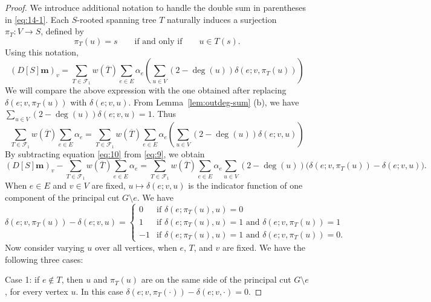 \documentclass{amsart}
\theoremstyle{definition}
\newcommand{\boldm}{\mathbf{m}}
\newcommand{\trees}{\mathcal{F}_1}
\newcommand{\degout}{\deg^o}
\begin{document}
\begin{proof}
We introduce additional notation to handle the double sum in parentheses in \eqref{eq:14-1}.
Each $S$-rooted spanning tree $T$ naturally induces a surjection $\pi_T: V \to S$, defined by 
\[
	\pi_T(u) = s \qquad\text{if and only if}\qquad u \in T(s).
\]
Using this notation,
\begin{equation}
\label{eq:9}
	(D[S] \boldm)_v = \sum_{T \in \trees} w(\overline{T}) \sum_{e \in E} \alpha_e \left( \sum_{u \in V} (2 - \deg(u)) \delta(e; v,\pi_T(u)) \right)
\end{equation}
We will compare the above expression with the one obtained after replacing $\delta(e; v,\pi_T(u))$ with $\delta(e; v, u)$.
From Lemma~\ref{lem:outdeg-sum} (b), 
we have
$\displaystyle
	\sum_{u \in V} (2 - \deg(u)) \delta(e; v,u)
	= 1. 
$
Thus
\begin{equation}
\label{eq:10}
	\sum_{T \in \trees} w(\overline{T}) \sum_{e \in E} \alpha_e
	= \sum_{T \in \trees} w(\overline{T}) \sum_{e \in E} \alpha_e \left( \sum_{u \in V} (2 - \deg(u)) \delta(e; v,u) \right) 
\end{equation}
By subtracting equation \eqref{eq:10} from \eqref{eq:9}, we obtain
\[
	(D[S] \boldm)_v - \sum_{T \in \trees} w(\overline{T}) \sum_{e \in E} \alpha_e 
	= \sum_{T \in \trees} w(\overline{T}) \sum_{e \in E} \alpha_e \sum_{u \in V} (2 - \deg(u)) \Big(\delta(e; v, \pi_T(u)) - \delta(e; v, u) \Big).
\]
When $e \in E$ and $v \in V$ are fixed, $u \mapsto \delta(e; v, u)$ is the indicator function of one component of the principal cut $G \setminus e$.
We have
\begin{equation}
\label{eq:delta-diff}
	\delta(e; v, \pi_T(u)) - \delta(e; v, u) = \begin{cases}
	0 &\text{if } \delta(e; \pi_T(u), u) = 0 \\
	1 &\text{if } \delta(e; \pi_T(u), u) = 1 \text{ and } \delta(e; v, \pi_T(u)) = 1 \\
	-1 &\text{if } \delta(e; \pi_T(u), u) = 1 \text{ and } \delta(e; v, \pi_T(u)) = 0 .
	\end{cases}
\end{equation}
Now consider varying $u$ over all vertices, when $e$, $T$, and $v$ are fixed.
We have the following three cases:

Case 1: if $e \not \in T$, then $u$ and $\pi_T(u)$ are on the same side of the principal cut $G \setminus e$, for every vertex $u$.
In this case $\delta(e;v, \pi_T(\cdot)) - \delta(e; v, \cdot) = 0$.


\end{proof}
\end{document}
